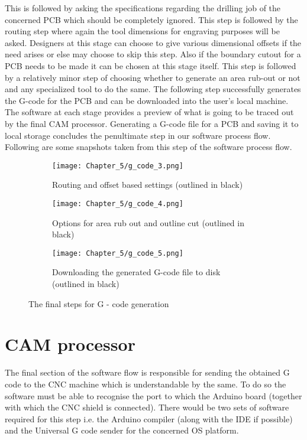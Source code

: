 This is followed by asking the specifications regarding the drilling job of the concerned PCB which should be completely ignored. This step is followed by the routing step where again the tool dimensions for engraving purposes will be asked. Designers at this stage can choose to give various dimensional offsets if the need arises or else may choose to skip this step. Also if the boundary cutout for a PCB needs to be made it can be chosen at this stage itself. This step is followed by a relatively minor step of choosing whether to generate an area rub-out or not and any specialized tool to do the same. The following step successfully generates the G-code for the PCB and can be downloaded into the user’s local machine. The software at each stage provides a preview of what is going to be traced out by the final CAM processor. Generating a G-code file for a PCB and saving it to local storage concludes the penultimate step in our software process flow. Following are some snapshots taken from this step of the software process flow. \par

\begin{figure}[h]
 \begin{subfigure}{0.5\textwidth}
  \texttt{[image: Chapter\_5/g\_code\_3.png]}
  \caption{Routing and offset based settings (outlined in black)}
  \label{fig:g3}
 \end{subfigure}
 \begin{subfigure}{0.5\textwidth}
  \texttt{[image: Chapter\_5/g\_code\_4.png]}
  \caption{Options for area rub out and outline cut (outlined in black)}
  \label{fig:g4}
 \end{subfigure}
 \begin{center}
  \begin{subfigure}{0.5\textwidth}
   \texttt{[image: Chapter\_5/g\_code\_5.png]}
   \caption{Downloading the generated G-code file to disk (outlined in black)}
   \label{fig:g5}
  \end{subfigure}
 \end{center}

 \caption{The final steps for G - code generation}
 \label{fig:g345}
\end{figure}

\section{CAM processor}

The final section \cite{online_tutorial} of the software flow is responsible for sending the obtained G code to the CNC machine which is understandable by the same. To do so the software must be able to recognise the port to which the Arduino board (together with which the CNC shield is connected). There would be two sets of software required for this step i.e. the Arduino compiler (along with the IDE if possible) and the Universal G code sender for the concerned OS platform. \par

